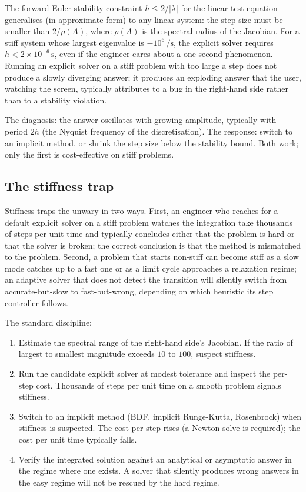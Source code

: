 The forward-Euler stability constraint $h \leq 2/|\lambda|$ for the
linear test equation generalises (in approximate form) to any
linear system: the step size must be smaller than $2/\rho(A)$,
where $\rho(A)$ is the spectral radius of the Jacobian. For a
stiff system whose largest eigenvalue is $-10^{6}\,\si{\per
\second}$, the explicit solver requires $h < 2 \times 10^{-6}\,\si
{\second}$, even if the engineer cares about a one-second
phenomenon. Running an explicit solver on a stiff problem with too
large a step does not produce a slowly diverging answer; it
produces an exploding answer that the user, watching the screen,
typically attributes to a bug in the right-hand side rather than to
a stability violation.

The diagnosis: the answer oscillates with growing amplitude,
typically with period $2 h$ (the Nyquist frequency of the
discretisation). The response: switch to an implicit method, or
shrink the step size below the stability bound. Both work; only
the first is cost-effective on stiff problems.

\subsection{The stiffness trap}

Stiffness traps the unwary in two ways. First, an engineer who
reaches for a default explicit solver on a stiff problem watches
the integration take thousands of steps per unit time and
typically concludes either that the problem is hard or that the
solver is broken; the correct conclusion is that the method is
mismatched to the problem. Second, a problem that starts non-stiff
can become stiff as a slow mode catches up to a fast one or as a
limit cycle approaches a relaxation regime; an adaptive solver
that does not detect the transition will silently switch from
accurate-but-slow to fast-but-wrong, depending on which heuristic
its step controller follows.

The standard discipline:

\begin{enumerate}[leftmargin=*]
  \item Estimate the spectral range of the right-hand side's
    Jacobian. If the ratio of largest to smallest magnitude exceeds
    $10$ to $100$, suspect stiffness.
  \item Run the candidate explicit solver at modest tolerance and
    inspect the per-step cost. Thousands of steps per unit time on
    a smooth problem signals stiffness.
  \item Switch to an implicit method (BDF, implicit Runge-Kutta,
    Rosenbrock) when stiffness is suspected. The cost per step
    rises (a Newton solve is required); the cost per unit time
    typically falls.
  \item Verify the integrated solution against an analytical or
    asymptotic answer in the regime where one exists. A solver that
    silently produces wrong answers in the easy regime will not be
    rescued by the hard regime.
\end{enumerate}


